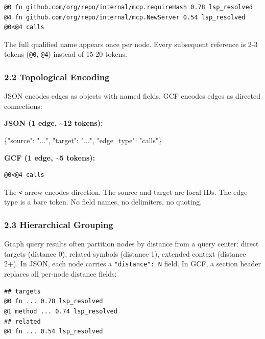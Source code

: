 \documentclass[
  11pt,
  paper=a4,
  ,captions=tableheading
]{scrartcl}
\newenvironment{Shaded}{}{}
\newcommand{\DataTypeTok}[1]{\textcolor[rgb]{0.56,0.13,0.00}{#1}}
\newcommand{\FunctionTok}[1]{\textcolor[rgb]{0.02,0.16,0.49}{#1}}
\newcommand{\StringTok}[1]{\textcolor[rgb]{0.25,0.44,0.63}{#1}}
\begin{document}
\begin{verbatim}
@0 fn github.com/org/repo/internal/mcp.requireHash 0.78 lsp_resolved
@4 fn github.com/org/repo/internal/mcp.NewServer 0.54 lsp_resolved
@0<@4 calls
\end{verbatim}

The full qualified name appears once per node. Every subsequent
reference is 2-3 tokens (\texttt{@0}, \texttt{@4}) instead of 15-20
tokens.

\subsubsection{2.2 Topological Encoding}\label{topological-encoding}

JSON encodes edges as objects with named fields. GCF encodes edges as
directed connections:

\textbf{JSON (1 edge, \textasciitilde12 tokens):}

\begin{Shaded}
\begin{Highlighting}[]
\FunctionTok{\{}\DataTypeTok{"source"}\FunctionTok{:} \StringTok{"..."}\FunctionTok{,} \DataTypeTok{"target"}\FunctionTok{:} \StringTok{"..."}\FunctionTok{,} \DataTypeTok{"edge\_type"}\FunctionTok{:} \StringTok{"calls"}\FunctionTok{\}}
\end{Highlighting}
\end{Shaded}

\textbf{GCF (1 edge, \textasciitilde5 tokens):}

\begin{verbatim}
@0<@4 calls
\end{verbatim}

The \texttt{\textless{}} arrow encodes direction. The source and target
are local IDs. The edge type is a bare token. No field names, no
delimiters, no quoting.

\subsubsection{2.3 Hierarchical Grouping}\label{hierarchical-grouping}

Graph query results often partition nodes by distance from a query
center: direct targets (distance 0), related symbols (distance 1),
extended context (distance 2+). In JSON, each node carries a
\texttt{"distance":\ N} field. In GCF, a section header replaces all
per-node distance fields:

\begin{verbatim}
## targets
@0 fn ... 0.78 lsp_resolved
@1 method ... 0.74 lsp_resolved
## related
@4 fn ... 0.54 lsp_resolved
\end{verbatim}
\end{document}
